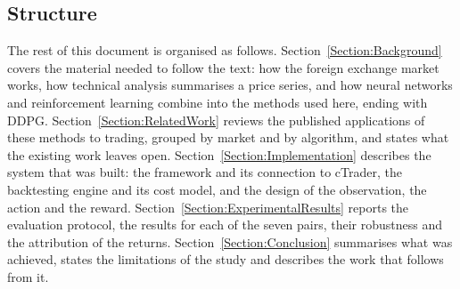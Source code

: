 \subsection{Structure}

The rest of this document is organised as follows. Section~\ref{Section:Background} covers the material needed to follow the text: how the foreign exchange market works, how technical analysis summarises a price series, and how neural networks and reinforcement learning combine into the methods used here, ending with DDPG. Section~\ref{Section:RelatedWork} reviews the published applications of these methods to trading, grouped by market and by algorithm, and states what the existing work leaves open. Section~\ref{Section:Implementation} describes the system that was built: the framework and its connection to cTrader, the backtesting engine and its cost model, and the design of the observation, the action and the reward. Section~\ref{Section:ExperimentalResults} reports the evaluation protocol, the results for each of the seven pairs, their robustness and the attribution of the returns. Section~\ref{Section:Conclusion} summarises what was achieved, states the limitations of the study and describes the work that follows from it.